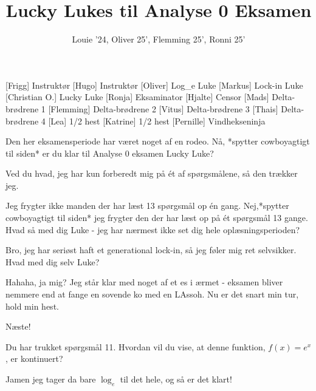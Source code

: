 \documentclass[a4paper,11pt]{article}
\title{Lucky Lukes til Analyse 0 Eksamen}
\author{Louie '24, Oliver 25', Flemming 25', Ronni 25'}
\begin{document}
\maketitle

\begin{roles}
[Frigg] Instruktør
[Hugo] Instruktør
[Oliver] Log\_e Luke
[Markus] Lock-in Luke
[Christian O.] Lucky Luke
[Ronja] Eksaminator
[Hjalte] Censor
[Mads] Delta-brødrene 1
[Flemming] Delta-brødrene 2
[Vitus] Delta-brødrene 3
[Thais] Delta-brødrene 4
[Lea] 1/2 hest
[Katrine] 1/2 hest
[Pernille] Vindhekseninja
\end{roles}

\begin{sketch}

 Den her eksamensperiode har været noget af en rodeo. Nå, *spytter cowboyagtigt til siden* er du klar til Analyse 0 eksamen Lucky Luke?

 Ved du hvad, jeg har kun forberedt mig på ét af spørgsmålene, så den trækker jeg.

 Jeg frygter ikke manden der har læst 13 spørgsmål op én gang. Nej,*spytter cowboyagtigt til siden* jeg frygter den der har læst op på ét spørgsmål 13 gange. Hvad så med dig Luke - jeg har nærmest ikke set dig hele oplæsningsperioden?

  Bro, jeg har seriøst haft et generational lock-in, så jeg føler mig ret selvsikker. Hvad med dig selv Luke?

 Hahaha, ja mig? Jeg står klar med  noget af et es i ærmet - eksamen bliver nemmere end at fange en sovende ko med en LAssoh. Nu er det snart min tur, hold min hest.


 Næste!


 Du har trukket spørgsmål 11. Hvordan vil du vise, at denne funktion, $f(x)=e^x$, er kontinuert?

 Jamen jeg tager da bare $\log_e$ til det hele, og så er det klart!


\end{sketch}
\end{document}
